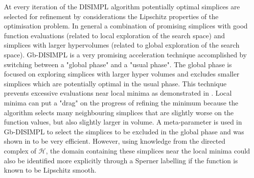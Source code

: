 At every iteration of the DISIMPL algorithm potentially optimal simplices are selected for refinement by considerations the Lipschitz properties of the optimisation problem. In general a combination of promising simplices with good function evaluations (related to local exploration of the search space) and simplices with larger hypervolumes (related to global exploration of the search space). Gb-DISIMPL \cite{Paul2014a} is a very promising acceleration technique accomplished by switching between a "global phase" and a "usual phase". The global phase is focused on exploring simplices with larger hyper volumes and excludes smaller simplices which are potentially optimal in the usual phase. This technique prevents excessive evaluations near local minima as demonstrated in \cite{Paul2014a}. Local minima can put a "drag" on the progress of refining the minimum because the algorithm selects many neighbouring simplices that are slightly worse on the function values, but also slightly larger in volume. A meta-parameter is used in Gb-DISIMPL to select the simplices to be excluded in the global phase and was shown in \cite{Paul2014a} to be very efficient. However, using knowledge from the directed complex of $\mathcal{H}$, the domain containing these simplices near the local minima could also be identified more explicitly through a Sperner labelling if the function is known to be Lipschitz smooth.







